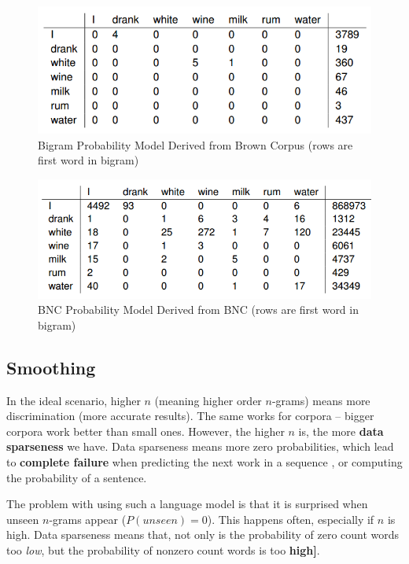 \documentclass{article}
\begin{document}
\begin{figure}
	\centering
	\includegraphics[scale=0.5]{figures/brown-bigram-model.png}
	\caption{Bigram Probability Model Derived from Brown Corpus (rows are first word in bigram)}
	\label{fig:brown-bigram-model}
\end{figure}

\begin{figure}
	\centering
	\includegraphics[scale=0.5]{figures/bnc-bigram-model.png}
	\caption{BNC Probability Model Derived from BNC (rows are first word in bigram)}
	\label{fig:bnc-bigram-model}
\end{figure}

\subsection{Smoothing}

In the ideal scenario, higher $n$ (meaning higher order $n$-grams) means more discrimination (more accurate results). The same works for corpora -- bigger corpora work better than small ones. However, the higher $n$ is, the more \textbf{data sparseness} we have. Data sparseness means more zero probabilities, which lead to \textbf{complete failure} when predicting the next work in a sequence , or computing the probability of a sentence.

The problem with using such a language model is that it is surprised when unseen $n$-grams appear ($P(unseen) = 0$). This happens often, especially if $n$ is high. Data sparseness means that, not only is the probability of zero count words too \textit{low}, but the probability of nonzero count words is too \textbf{high]}.
\end{document}
